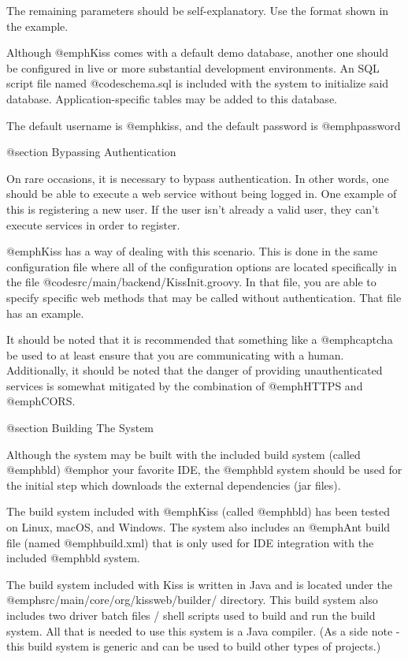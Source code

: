 The remaining parameters should be self-explanatory.  Use the format
shown in the example.

Although @emph{Kiss} comes with a default demo database, another one
should be configured in live or more substantial development
environments.  An SQL script file named @code{schema.sql} is included
with the system to initialize said database.  Application-specific tables
may be added to this database.

The default username is @emph{kiss}, and the default password is
@emph{password}

@section Bypassing Authentication

On rare occasions, it is necessary to bypass authentication.  In other
words, one should be able to execute a web service without being logged in.  One
example of this is registering a new user.  If the user isn't already a
valid user, they can't execute services in order to register.

@emph{Kiss} has a way of dealing with this scenario.  This is done in
the same configuration file where all of the configuration options are
located specifically in the file @code{src/main/backend/KissInit.groovy}.  In
that file, you are able to specify specific web methods that may be
called without authentication.  That file has an example.

It should be noted that it is recommended that something like a
@emph{captcha} be used to at least ensure that you are
communicating with a human.  Additionally, it should be noted that the
danger of providing unauthenticated services is somewhat mitigated by
the combination of @emph{HTTPS} and @emph{CORS}.

@section Building The System

Although the system may be built with the included build system
(called @emph{bld}) @emph{or} your favorite IDE, the @emph{bld}
system should be used for the initial step which downloads the external
dependencies (jar files).

The build system included with @emph{Kiss} (called @emph{bld}) has
been tested on Linux, macOS, and Windows.  The system also includes an
@emph{Ant} build file (named @emph{build.xml}) that is only used for
IDE integration with the included @emph{bld} system.

The build system included with Kiss is written in Java and is located
under the @emph{src/main/core/org/kissweb/builder/} directory.  This
build system also includes two driver batch files / shell scripts used
to build and run the build system.  All that is needed to use this
system is a Java compiler.  (As a side note - this build system is
generic and can be used to build other types of projects.)

